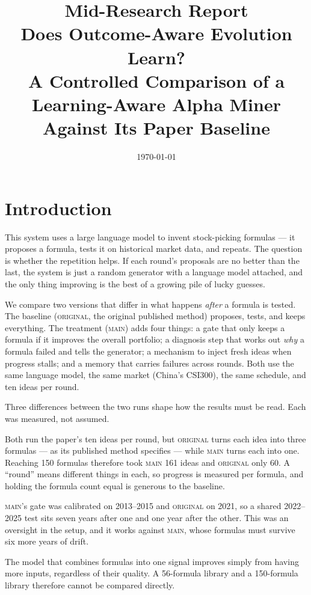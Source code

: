 \documentclass[11pt]{article}
\title{\vspace{-2.5em}\textbf{Mid-Research Report}\\[0.3em]
\large Does Outcome-Aware Evolution Learn?\\
A Controlled Comparison of a Learning-Aware Alpha Miner\\
Against Its Paper Baseline}
\date{\today}
\newcommand{\main}{\textsc{main}}
\newcommand{\orig}{\textsc{original}}
\begin{document}
\maketitle
\vspace{-2em}

\section{Introduction}
\label{sec:intro}

This system uses a large language model to invent stock-picking formulas --- it
proposes a formula, tests it on historical market data, and repeats. The question is
whether the repetition helps. If each round's proposals are no better than the last,
the system is just a random generator with a language model attached, and the only
thing improving is the best of a growing pile of lucky guesses.

We compare two versions that differ in what happens \emph{after} a formula is tested.
The baseline (\orig{}, the original published method) proposes, tests, and keeps
everything. The treatment (\main{}) adds four things: a gate that only keeps a formula
if it improves the overall portfolio; a diagnosis step that works out \emph{why} a
formula failed and tells the generator; a mechanism to inject fresh ideas when
progress stalls; and a memory that carries failures across rounds. Both use the same
language model, the same market (China's CSI300), the same schedule, and ten ideas per
round.

Three differences between the two runs shape how the results must be read. Each was
measured, not assumed.

\begin{description}[leftmargin=0em,itemsep=0.25em,style=nextline]
\item[The same 150 formulas cost different effort (\S\ref{sub:budget}).]
  Both run the paper's ten ideas per round, but \orig{} turns each idea into three
  formulas --- as its published method specifies --- while \main{} turns each into one.
  Reaching 150 formulas therefore took \main{} 161 ideas and \orig{} only 60. A
  ``round'' means different things in each, so progress is measured per formula, and
  holding the formula count equal is generous to the baseline.
\item[The two runs were tuned on different eras (\S\ref{sec:learning}).]
  \main{}'s gate was calibrated on 2013--2015 and \orig{} on 2021, so a shared
  2022--2025 test sits seven years after one and one year after the other. This was an
  oversight in the setup, and it works against \main{}, whose formulas must survive six
  more years of drift.
\item[More formulas automatically score better (\S\ref{sub:count}).]
  The model that combines formulas into one signal improves simply from having more
  inputs, regardless of their quality. A 56-formula library and a 150-formula library
  therefore cannot be compared directly.
\end{description}
\end{document}

